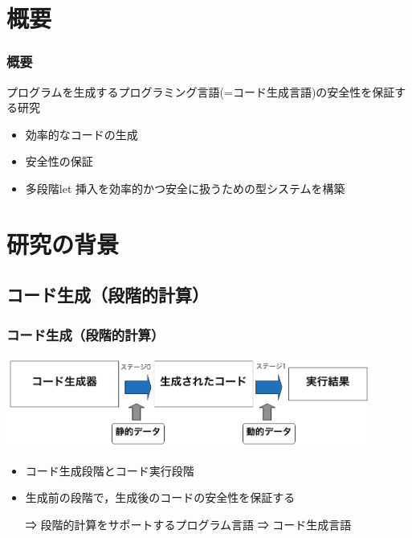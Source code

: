 
\section{概要}

\begin{frame}
  \frametitle{概要}
  プログラムを生成するプログラミング言語(=\alert{コード生成言語})の安全性を保証する研究
  \begin{itemize}
  \item<2-> 効率的なコードの生成
  \item<2-> 安全性の保証
  \item<3-> [⇒] \alert{多段階let 挿入}を効率的かつ安全に扱うための型システムを構築
  \end{itemize}
\end{frame}

\section{研究の背景}
\subsection{コード生成（段階的計算）}
\begin{frame}
  \frametitle{コード生成（段階的計算）}
  \includegraphics[clip,width=12cm]{./img/prggen.png}
  \begin{itemize}
  \item コード生成段階とコード実行段階
  \item 生成前の段階で，生成後のコードの安全性を保証する
  \item[⇒] 段階的計算をサポートするプログラム言語 ⇒ コード生成言語
  \end{itemize}
\end{frame}

